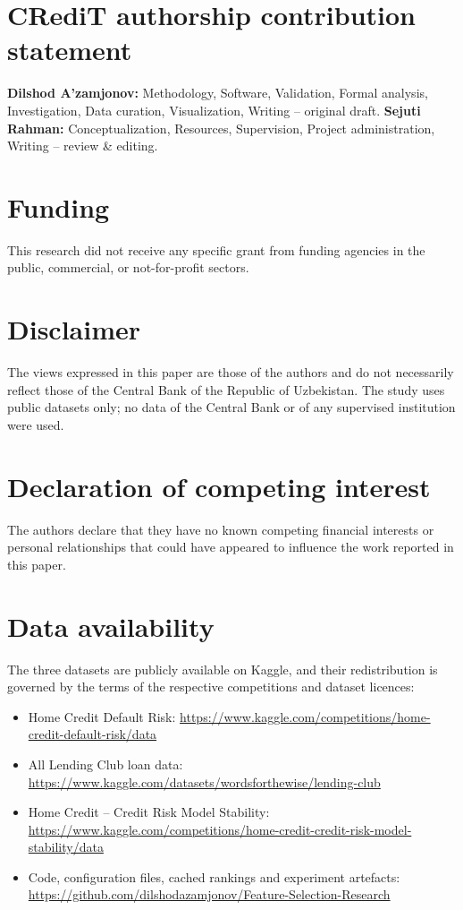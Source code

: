 \documentclass[final,5p,twocolumn]{elsarticle}
\begin{document}

\section*{CRediT authorship contribution statement}
\textbf{Dilshod A'zamjonov:} Methodology, Software, Validation, Formal analysis, Investigation, Data curation, Visualization, Writing -- original draft. \textbf{Sejuti Rahman:} Conceptualization, Resources, Supervision, Project administration, Writing -- review \& editing.

\section*{Funding}
This research did not receive any specific grant from funding agencies in the public, commercial, or not-for-profit sectors.

\section*{Disclaimer}
The views expressed in this paper are those of the authors and do not necessarily reflect those of the Central Bank of the Republic of Uzbekistan. The study uses public datasets only; no data of the Central Bank or of any supervised institution were used.

\section*{Declaration of competing interest}
The authors declare that they have no known competing financial interests or personal relationships that could have appeared to influence the work reported in this paper.

\section*{Data availability}
The three datasets are publicly available on Kaggle, and their redistribution is governed by the terms of the respective competitions and dataset licences:
\begin{itemize}
    \item Home Credit Default Risk: \url{https://www.kaggle.com/competitions/home-credit-default-risk/data}
    \item All Lending Club loan data: \url{https://www.kaggle.com/datasets/wordsforthewise/lending-club}
    \item Home Credit -- Credit Risk Model Stability: \url{https://www.kaggle.com/competitions/home-credit-credit-risk-model-stability/data}
    \item Code, configuration files, cached rankings and experiment artefacts: \url{https://github.com/dilshodazamjonov/Feature-Selection-Research}
\end{itemize}
\end{document}
